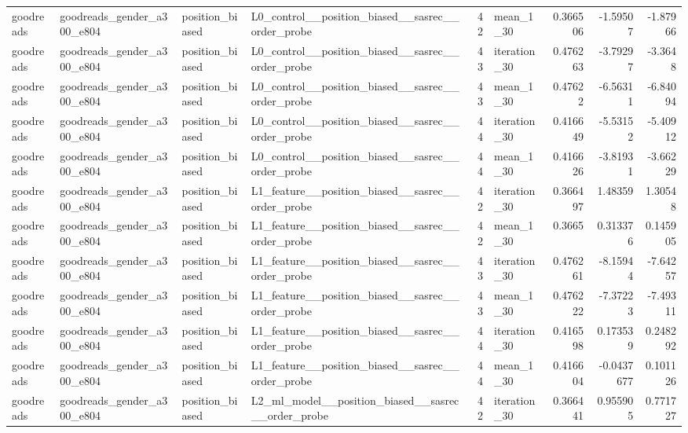 \begin{table}[htbp!]
\begin{tabular}{llllrlrrr}
goodreads & goodreads\_gender\_a300\_e804 & position\_biased & L0\_control\_\_position\_biased\_\_sasrec\_\_order\_probe & 42 & mean\_1\_30 & 0.366506 & -1.59507 & -1.87966 \\
goodreads & goodreads\_gender\_a300\_e804 & position\_biased & L0\_control\_\_position\_biased\_\_sasrec\_\_order\_probe & 43 & iteration\_30 & 0.476263 & -3.79297 & -3.3648 \\
goodreads & goodreads\_gender\_a300\_e804 & position\_biased & L0\_control\_\_position\_biased\_\_sasrec\_\_order\_probe & 43 & mean\_1\_30 & 0.47622 & -6.56311 & -6.84094 \\
goodreads & goodreads\_gender\_a300\_e804 & position\_biased & L0\_control\_\_position\_biased\_\_sasrec\_\_order\_probe & 44 & iteration\_30 & 0.416649 & -5.53152 & -5.40912 \\
goodreads & goodreads\_gender\_a300\_e804 & position\_biased & L0\_control\_\_position\_biased\_\_sasrec\_\_order\_probe & 44 & mean\_1\_30 & 0.416626 & -3.81931 & -3.66229 \\
goodreads & goodreads\_gender\_a300\_e804 & position\_biased & L1\_feature\_\_position\_biased\_\_sasrec\_\_order\_probe & 42 & iteration\_30 & 0.366497 & 1.48359 & 1.30548 \\
goodreads & goodreads\_gender\_a300\_e804 & position\_biased & L1\_feature\_\_position\_biased\_\_sasrec\_\_order\_probe & 42 & mean\_1\_30 & 0.3665 & 0.313376 & 0.145905 \\
goodreads & goodreads\_gender\_a300\_e804 & position\_biased & L1\_feature\_\_position\_biased\_\_sasrec\_\_order\_probe & 43 & iteration\_30 & 0.476261 & -8.15944 & -7.64257 \\
goodreads & goodreads\_gender\_a300\_e804 & position\_biased & L1\_feature\_\_position\_biased\_\_sasrec\_\_order\_probe & 43 & mean\_1\_30 & 0.476222 & -7.37223 & -7.49311 \\
goodreads & goodreads\_gender\_a300\_e804 & position\_biased & L1\_feature\_\_position\_biased\_\_sasrec\_\_order\_probe & 44 & iteration\_30 & 0.416598 & 0.173539 & 0.248292 \\
goodreads & goodreads\_gender\_a300\_e804 & position\_biased & L1\_feature\_\_position\_biased\_\_sasrec\_\_order\_probe & 44 & mean\_1\_30 & 0.416604 & -0.0437677 & 0.101126 \\
goodreads & goodreads\_gender\_a300\_e804 & position\_biased & L2\_ml\_model\_\_position\_biased\_\_sasrec\_\_order\_probe & 42 & iteration\_30 & 0.366441 & 0.955905 & 0.771727 \\

\end{tabular}
\end{table}
